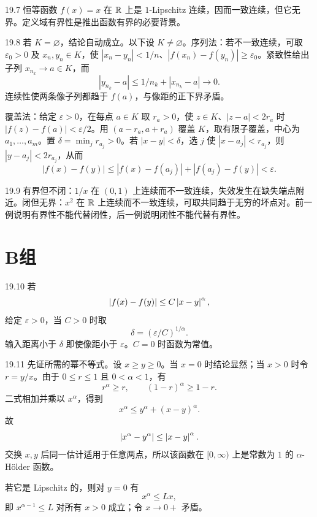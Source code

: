 \begin{solution}{19.7}
恒等函数 \(f(x)=x\) 在 \(\mathbb{R}\) 上是 \(1\)-Lipschitz 连续，因而一致连续，但它无界。定义域有界性是推出函数有界的必要背景。
\end{solution}

\begin{solution}{19.8}
若 \(K=\varnothing\)，结论自动成立。以下设 \(K\ne\varnothing\)。序列法：若不一致连续，可取 \(\varepsilon_0>0\) 及 \(x_n,y_n\in K\)，使 \(|x_n-y_n|<1/n\)、\(|f(x_n)-f(y_n)|\ge\varepsilon_0\)。紧致性给出子列 \(x_{n_k}\to a\in K\)，而
\[
 |y_{n_k}-a|\le1/n_k+|x_{n_k}-a|\to0.
\]
连续性使两条像子列都趋于 \(f(a)\)，与像距的正下界矛盾。

覆盖法：给定 \(\varepsilon>0\)，在每点 \(a\in K\) 取 \(r_a>0\)，使 \(z\in K\)、\(|z-a|<2r_a\) 时 \(|f(z)-f(a)|<\varepsilon/2\)。用 \((a-r_a,a+r_a)\) 覆盖 \(K\)，取有限子覆盖，中心为 \(a_1,\ldots,a_m\)。置 \(\delta=\min_j r_{a_j}>0\)。若 \(|x-y|<\delta\)，选 \(j\) 使 \(|x-a_j|<r_{a_j}\)，则 \(|y-a_j|<2r_{a_j}\)，从而
\[
 |f(x)-f(y)|\le|f(x)-f(a_j)|+|f(a_j)-f(y)|<\varepsilon.
\]
\end{solution}

\begin{solution}{19.9}
有界但不闭：\(1/x\) 在 \((0,1)\) 上连续而不一致连续，失效发生在缺失端点附近。闭但无界：\(x^2\) 在 \(\mathbb{R}\) 上连续而不一致连续，可取共同趋于无穷的坏点对。前一例说明有界性不能代替闭性，后一例说明闭性不能代替有界性。
\end{solution}

\section*{B组}

\begin{solution}{19.10}
若
\[
 \left|f(x)-f(y)\right|\le C\left|x-y\right|^{\alpha},
\]
给定 \(\varepsilon>0\)，当 \(C>0\) 时取
\[
 \delta=(\varepsilon/C)^{1/\alpha}.
\]
输入距离小于 \(\delta\) 即使像距小于 \(\varepsilon\)。\(C=0\) 时函数为常值。
\end{solution}

\begin{solution}{19.11}
先证所需的幂不等式。设 \(x\ge y\ge0\)。当 \(x=0\) 时结论显然；当 \(x>0\) 时令 \(r=y/x\)。由于 \(0\le r\le1\) 且 \(0<\alpha<1\)，有
\[
 r^\alpha\ge r,
 \qquad (1-r)^\alpha\ge1-r.
\]
二式相加并乘以 \(x^\alpha\)，得到
\[
 x^\alpha\le y^\alpha+(x-y)^\alpha.
\]
故
\[
 \left|x^\alpha-y^\alpha\right|\le\left|x-y\right|^\alpha.
\]
交换 \(x,y\) 后同一估计适用于任意两点，所以该函数在 \([0,\infty)\) 上是常数为 \(1\) 的 \(\alpha\)-Hölder 函数。

若它是 Lipschitz 的，则对 \(y=0\) 有
\[
 x^\alpha\le Lx,
\]
即 \(x^{\alpha-1}\le L\) 对所有 \(x>0\) 成立；令 \(x\to0+\) 矛盾。
\end{solution}

